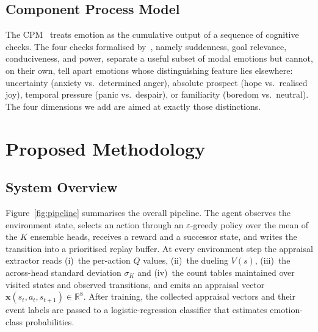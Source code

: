 \documentclass[conference]{IEEEtran}
\begin{document}
\subsection{Component Process Model}
The CPM~\cite{scherer2001appraisal} treats emotion as the cumulative
output of a sequence of cognitive checks. The four checks
formalised by~\cite{zhang2023modeling}, namely suddenness, goal relevance,
conduciveness, and power, separate a useful subset of modal emotions
but cannot, on their own, tell apart emotions whose distinguishing
feature lies elsewhere: uncertainty (anxiety vs.\ determined anger),
absolute prospect (hope vs.\ realised joy), temporal pressure (panic
vs.\ despair), or familiarity (boredom vs.\ neutral). The four
dimensions we add are aimed at exactly those distinctions.

\section{Proposed Methodology}
\label{sec:method}

\subsection{System Overview}
Figure~\ref{fig:pipeline} summarises the overall pipeline. The agent observes
the environment state, selects an action through an $\varepsilon$-greedy
policy over the mean of the $K$ ensemble heads, receives a reward and a
successor state, and writes the transition into a prioritised replay buffer.
At every environment step the appraisal extractor reads (i)~the per-action
$Q$ values, (ii)~the dueling $V(s)$, (iii)~the across-head standard deviation
$\sigma_{K}$ and (iv)~the count tables maintained over visited states and
observed transitions, and emits an appraisal vector
$\mathbf{x}(s_{t}, a_{t}, s_{t+1}) \in \mathbb{R}^{8}$. After training, the
collected appraisal vectors and their event labels are passed to a
logistic-regression classifier that estimates emotion-class probabilities.
\end{document}
